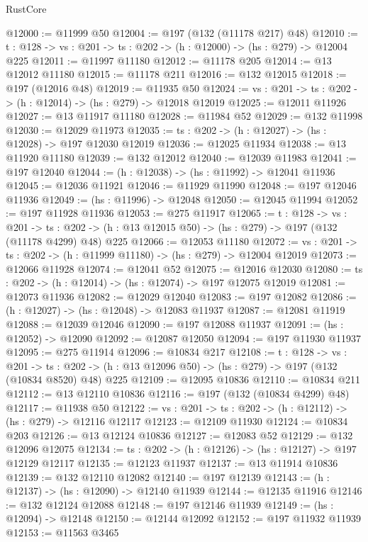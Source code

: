 \begin{lexlean}{RustCore}
\begin{coremodule}
@12000 := @11999 @50
@12004 := @197 (@132 (@11178 @217) @48)
@12010 := {t : @128} -> {vs : @201} -> {ts : @202} -> (h : @12000) -> (hs : @279) -> @12004 @225
@12011 := @11997 @11180
@12012 := @11178 @205
@12014 := @13 @12012 @11180
@12015 := @11178 @211
@12016 := @132 @12015
@12018 := @197 (@12016 @48)
@12019 := @11935 @50
@12024 := {vs : @201} -> {ts : @202} -> (h : @12014) -> (hs : @279) -> @12018 @12019
@12025 := @12011 @11926
@12027 := @13 @11917 @11180
@12028 := @11984 @52
@12029 := @132 @11998
@12030 := @12029 @11973
@12035 := {ts : @202} -> (h : @12027) -> (hs : @12028) -> @197 @12030 @12019
@12036 := @12025 @11934
@12038 := @13 @11920 @11180
@12039 := @132 @12012
@12040 := @12039 @11983
@12041 := @197 @12040
@12044 := (h : @12038) -> (hs : @11992) -> @12041 @11936
@12045 := @12036 @11921
@12046 := @11929 @11990
@12048 := @197 @12046 @11936
@12049 := (hs : @11996) -> @12048
@12050 := @12045 @11994
@12052 := @197 @11928 @11936
@12053 := @275 @11917
@12065 := {t : @128} ->
  {vs : @201} ->
  {ts : @202} -> (h : @13 @12015 @50) -> (hs : @279) -> @197 (@132 (@11178 @4299) @48) @225
@12066 := @12053 @11180
@12072 := {vs : @201} -> {ts : @202} -> (h : @11999 @11180) -> (hs : @279) -> @12004 @12019
@12073 := @12066 @11928
@12074 := @12041 @52
@12075 := @12016 @12030
@12080 := {ts : @202} -> (h : @12014) -> (hs : @12074) -> @197 @12075 @12019
@12081 := @12073 @11936
@12082 := @12029 @12040
@12083 := @197 @12082
@12086 := (h : @12027) -> (hs : @12048) -> @12083 @11937
@12087 := @12081 @11919
@12088 := @12039 @12046
@12090 := @197 @12088 @11937
@12091 := (hs : @12052) -> @12090
@12092 := @12087 @12050
@12094 := @197 @11930 @11937
@12095 := @275 @11914
@12096 := @10834 @217
@12108 := {t : @128} ->
  {vs : @201} ->
  {ts : @202} -> (h : @13 @12096 @50) -> (hs : @279) -> @197 (@132 (@10834 @8520) @48) @225
@12109 := @12095 @10836
@12110 := @10834 @211
@12112 := @13 @12110 @10836
@12116 := @197 (@132 (@10834 @4299) @48)
@12117 := @11938 @50
@12122 := {vs : @201} -> {ts : @202} -> (h : @12112) -> (hs : @279) -> @12116 @12117
@12123 := @12109 @11930
@12124 := @10834 @203
@12126 := @13 @12124 @10836
@12127 := @12083 @52
@12129 := @132 @12096 @12075
@12134 := {ts : @202} -> (h : @12126) -> (hs : @12127) -> @197 @12129 @12117
@12135 := @12123 @11937
@12137 := @13 @11914 @10836
@12139 := @132 @12110 @12082
@12140 := @197 @12139
@12143 := (h : @12137) -> (hs : @12090) -> @12140 @11939
@12144 := @12135 @11916
@12146 := @132 @12124 @12088
@12148 := @197 @12146 @11939
@12149 := (hs : @12094) -> @12148
@12150 := @12144 @12092
@12152 := @197 @11932 @11939
@12153 := @11563 @3465

\end{coremodule}
\end{lexlean}

